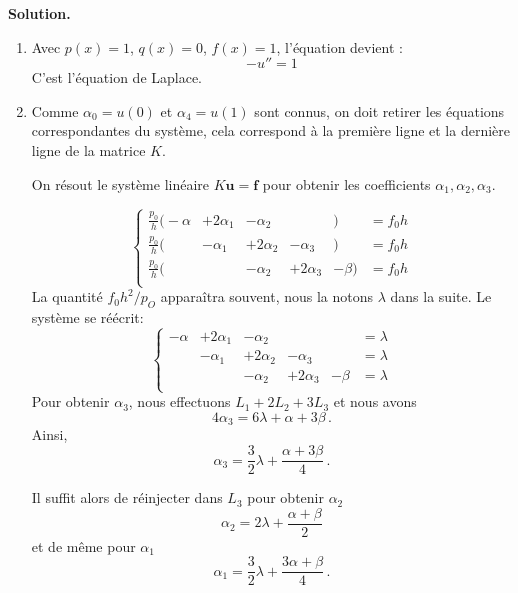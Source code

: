 \documentclass[11pt,a4paper]{report}
\newenvironment{solution}
{
    \vspace{0.5em}
    \begin{mdframed}[backgroundcolor=ThemeLight,leftmargin=0,rightmargin=0,skipabove=0.2em,skipbelow=0.2em]
    \textbf{Solution.}\\[0.5em]
}
{
    \end{mdframed}
    \vspace{0.5em}
}
\begin{document}
\begin{enumerate}[itemsep=0.5em]
{\begin{solution}
    \begin{enumerate}
        \item Avec \( p(x) = 1 \), \( q(x) = 0 \), \( f(x) = 1 \), l'équation devient :
        \[
        -u'' = 1
        \]
        C'est l'équation de Laplace. 

        \item Comme $\alpha_0 = u(0)$ et $\alpha_4 = u(1)$ sont connus, on doit retirer les équations correspondantes du système, cela correspond à la première ligne et la dernière ligne de la matrice $K$.
        
        On résout le système linéaire $K \mathbf{u} = \mathbf{f}$ pour obtenir les coefficients $\alpha_1, \alpha_2, \alpha_3$.

        \[
        \left\{
        \begin{array}{cccccc}
             \frac{p_0}{h}\Big(- \alpha & +  2 \alpha_1 &- \alpha_2 & & \Big)  &=  f_0 h \\
             \frac{p_0}{h}\Big( & - \alpha_1 &+  2 \alpha_2& - \alpha_3 &\Big)  &=  f_0 h \\
             \frac{p_0}{h}\Big(  & & - \alpha_2 &+  2 \alpha_3 &- \beta\Big)  &=  f_0 h \\
        \end{array}
        \right.
        \]
        La quantité $f_0 h^2/p_O$ apparaîtra souvent, nous la notons $\lambda$ dans la suite. Le système se réécrit:
        \[
            \left\{
                \begin{array}{cccccc}
                     - \alpha &+ 2 \alpha_1 &- \alpha_2 & & &=  \lambda \\
                     & - \alpha_1 &+ 2 \alpha_2 &- \alpha_3  & &=  \lambda \\
                     & & - \alpha_2 &+ 2 \alpha_3 &- \beta &= \lambda \\
                \end{array}
                \right.
        \]
         Pour obtenir $\alpha_3$, nous effectuons $L_1+2L_2+3L_3$ et nous avons
         \[
         4 \alpha_3 = 6 \lambda + \alpha + 3 \beta\,.
         \]
         Ainsi, 
         \[
         \alpha_3 = \frac{3}{2}\lambda + \frac{\alpha +3\beta}{4}\,.
         \]

         Il suffit alors de réinjecter dans $L_3$ pour obtenir $\alpha_2$ 
         \[
         \alpha_2 = 2\lambda + \frac{\alpha + \beta}{2}
         \]
         et de même pour $\alpha_1$
         \[
         \alpha_1 = \frac{3}{2}\lambda + \frac{3\alpha + \beta}{4}\,.
         \]
        

\end{enumerate}
\end{solution}}
\end{enumerate}
\end{document}

